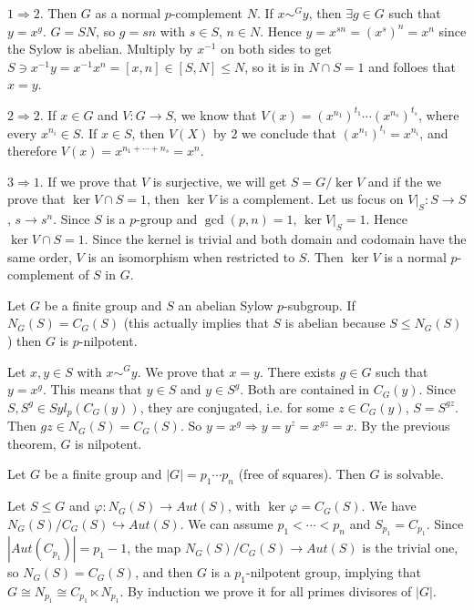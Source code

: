 \documentclass[twoside, 11pt]{article}
\begin{document}
\begin{dem}
$1\Rightarrow 2$. Then $G$ as a normal $p$-complement $N$. If $x\sim^G y$, then $\exists g\in G$ such that $y=x^g$. $G=SN$, so $g=sn$ with $s\in S$, $n\in N$. Hence $y=x^{sn}=(x^s)^n=x^n$ since the Sylow is abelian. Multiply by $x^{-1}$ on both sides to get $S\ni x^{-1}y=x^{-1}x^n=[x,n]\in[S,N]\leq N$, so it is in $N\cap S=1$ and folloes that $x=y$. 

$2\Rightarrow 2$. If $x\in G$ and $V:G\to S$, we know that $V(x)=(x^{n_1})^{t_1}\cdots(x^{n_s})^{t_s}$, where every $x^{n_i}\in S$. If $x\in S$, then $V(X)$ by 2 we conclude that $(x^{n_1})^{t_i}=x^{n_i}$, and therefore $V(x)=x^{n_1+\cdots +n_s}=x^n$. 

$3\Rightarrow 1$. If we prove that $V$ is surjective, we will get $S=G/\ker V$ and if the we prove that $\ker V\cap S=1$, then $\ker V$ is a complement. Let us focus on $V|_{S}:S\to S$, $s\to s^n$. Since $S$ is a $p$-group and $\gcd(p,n)=1$, $\ker V|_{S}=1$. Hence $\ker V\cap S=1$. Since the kernel is trivial and both domain and codomain have the same order, $V$ is an isomorphism when restricted to $S$. Then $\ker V$ is a normal $p$-complement of $S$ in $G$. 
\end{dem}

\begin{teorema}[Burnside]
Let $G$ be a finite group and $S$ an abelian Sylow $p$-subgroup. If $N_G(S)=C_G(S)$ (this actually implies that $S$ is abelian because $S\leq N_G(S)$) then $G$ is $p$-nilpotent. 
\end{teorema}
\begin{dem}
Let $x,y\in S$ with $x\sim^G y$. We prove that $x=y$. There exists $g\in G$ such that $y=x^g$. This means that $y\in S$ and $y\in S^g$. Both are contained in $C_G(y)$. Since $S,S^g\in Syl_p(C_G(y))$, they are conjugated, i.e. for some $z\in C_G(y)$, $S=S^{gz}$. Then $gz\in N_G(S)=C_G(S)$. So $y=x^g\Rightarrow y=y^z=x^{gz}=x$. By the previous theorem, $G$ is nilpotent.
\end{dem}


\begin{coro}
Let $G$ be a finite group and $|G|=p_1\cdots p_n$ (free of squares). Then $G$ is solvable. 
\end{coro}
\begin{dem}
Let $S\leq G$ and $\varphi:N_G(S)\to Aut(S)$, with $\ker\varphi=C_G(S)$. We have $N_G(S)/C_G(S)\hookrightarrow Aut(S)$. We can assume $p_1<\cdots<p_n$ and $S_{p_1}=C_{p_1}$. Since $|Aut(C_{p_1})|=p_1-1$, the map $N_G(S)/C_G(S)\to Aut(S)$ is the trivial one, so $N_G(S)=C_G(S)$, and then $G$ is a $p_1$-nilpotent group, implying that $G\cong N_{p_1}\cong C_{p_1}\ltimes N_{p_1}$. By induction we prove it for all primes divisores of $|G|$.

\end{dem}
\end{document}
